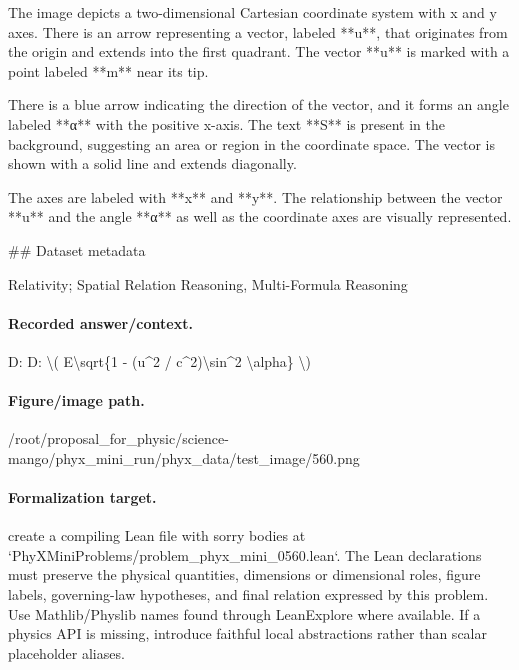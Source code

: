 The image depicts a two-dimensional Cartesian coordinate system with x and y axes. There is an arrow representing a vector, labeled **u**, that originates from the origin and extends into the first quadrant. The vector **u** is marked with a point labeled **m** near its tip.

There is a blue arrow indicating the direction of the vector, and it forms an angle labeled **α** with the positive x-axis. The text **S** is present in the background, suggesting an area or region in the coordinate space. The vector is shown with a solid line and extends diagonally.

The axes are labeled with **x** and **y**. The relationship between the vector **u** and the angle **α** as well as the coordinate axes are visually represented.

\#\# Dataset metadata

Relativity; Spatial Relation Reasoning, Multi-Formula Reasoning

\paragraph{Recorded answer/context.}
D: D: \textbackslash{}( E\textbackslash{}sqrt\{1 - (u\textasciicircum{}2 / c\textasciicircum{}2)\textbackslash{}sin\textasciicircum{}2 \textbackslash{}alpha\} \textbackslash{})

\paragraph{Figure/image path.}
/root/proposal\_for\_physic/science-mango/phyx\_mini\_run/phyx\_data/test\_image/560.png

\paragraph{Formalization target.}
create a compiling Lean file with sorry bodies at `PhyXMiniProblems/problem\_phyx\_mini\_0560.lean`. The Lean declarations must preserve the physical quantities, dimensions or dimensional roles, figure labels, governing-law hypotheses, and final relation expressed by this problem.
Use Mathlib/Physlib names found through LeanExplore where available. If a physics API is missing, introduce faithful local abstractions rather than scalar placeholder aliases.


